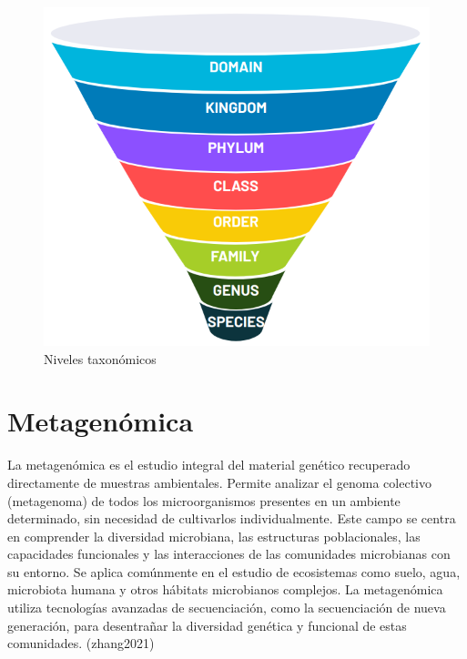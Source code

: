 \begin{figure}[h]
\centering
\includegraphics[scale=0.3]{Img/cap1/taxonomic.png}
\caption{Niveles taxonómicos}
\end{figure}

\section{Metagenómica}

La metagenómica es el estudio integral del material genético recuperado directamente de muestras ambientales. Permite analizar el genoma colectivo (metagenoma) de todos los microorganismos presentes en un ambiente determinado, sin necesidad de cultivarlos individualmente. Este campo se centra en comprender la diversidad microbiana, las estructuras poblacionales, las capacidades funcionales y las interacciones de las comunidades microbianas con su entorno. Se aplica comúnmente en el estudio de ecosistemas como suelo, agua, microbiota humana y otros hábitats microbianos complejos. La metagenómica utiliza tecnologías avanzadas de secuenciación, como la secuenciación de nueva generación, para desentrañar la diversidad genética y funcional de estas comunidades. (zhang2021)\\

